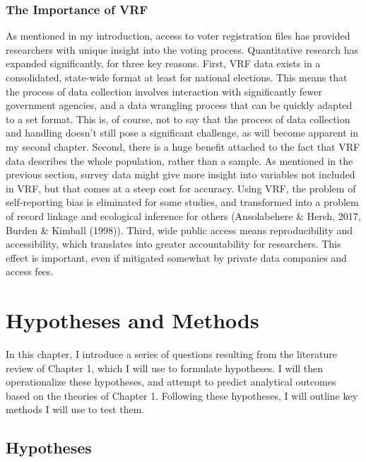 \documentclass[12pt,twoside]{reedthesis}
\begin{document}
  \subsection{The Importance of VRF}\label{the-importance-of-vrf}
  
  As mentioned in my introduction, access to voter registration files has
  provided researchers with unique insight into the voting process.
  Quantitative research has expanded significantly, for three key reasons.
  First, VRF data exists in a consolidated, state-wide format at least for
  national elections. This means that the process of data collection
  involves interaction with significantly fewer government agencies, and a
  data wrangling process that can be quickly adapted to a set format. This
  is, of course, not to say that the process of data collection and
  handling doesn't still pose a significant challenge, as will become
  apparent in my second chapter. Second, there is a huge benefit attached
  to the fact that VRF data describes the whole population, rather than a
  sample. As mentioned in the previous section, survey data might give
  more insight into variables not included in VRF, but that comes at a
  steep cost for accuracy. Using VRF, the problem of self-reporting bias
  is eliminated for some studies, and transformed into a problem of record
  linkage and ecological inference for others (Ansolabehere \& Hersh,
  2017, Burden \& Kimball (1998)). Third, wide public access means
  reproducibility and accessibility, which translates into greater
  accountability for researchers. This effect is important, even if
  mitigated somewhat by private data companies and access fees.
  
  \chapter{Hypotheses and Methods}\label{hypotheses-and-methods}
  
  In this chapter, I introduce a series of questions resulting from the
  literature review of Chapter 1, which I will use to formulate
  hypotheses. I will then operationalize these hypotheses, and attempt to
  predict analytical outcomes based on the theories of Chapter 1.
  Following these hypotheses, I will outline key methods I will use to
  test them.
  
  \section{Hypotheses}\label{hypotheses}
  
\end{document}
